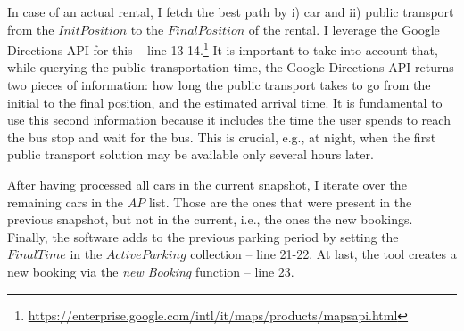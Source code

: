 In case of an actual rental, I fetch the best path by i) car and ii) public transport from the  $InitPosition$ to the $FinalPosition$ of the rental. I leverage the Google Directions API for this -- line 13-14.\footnote{\url{https://enterprise.google.com/intl/it/maps/products/mapsapi.html}}
It is important to take into account that, while querying the public transportation time, the Google Directions API returns two pieces of information: how long the public transport takes to go from the initial to the final position, and the estimated arrival time. It is fundamental to use this second information because  it includes the time the user spends to reach the bus stop and wait for the bus. This is crucial, e.g., at night, when the first public transport solution may be available only several hours later.

After having processed all cars in the current snapshot, I iterate over the remaining cars in the $AP$ list. Those are the ones that were present in the previous snapshot, but not in the current, i.e., the ones the new bookings. Finally, the software adds to the previous parking period by setting the $FinalTime$ in the $ActiveParking$ collection -- line 21-22. At last, the tool creates a new booking via the \textit{new Booking} function -- line 23.


